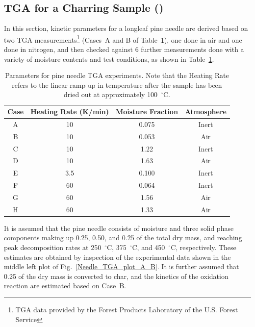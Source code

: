 \documentclass[11pt]{book}
\begin{document}
\subsection{TGA for a Charring Sample (\texorpdfstring{}{Needle\_TGA})}
\label{Needle_TGA}

In this section, kinetic parameters for a longleaf pine needle are derived based on two TGA measurements\footnote{TGA data provided by the Forest Products Laboratory of the U.S. Forest Service} (Cases~A and B of Table~\ref{Needle_TGA_table}), one done in air and one done in nitrogen, and then checked against 6 further measurements done with a variety of moisture contents and test conditions, as shown in Table~\ref{Needle_TGA_table}.

\begin{table}[!ht]
\centering
\caption[Parameters for pine needle TGA experiments]{Parameters for pine needle TGA experiments. Note that the Heating Rate refers to the linear ramp up in temperature after the sample has been dried out at approximately 100~$^\circ$C.}
\label{Needle_TGA_table}
\begin{tabular}{|c|c|c|c|}
\hline
Case & Heating Rate (K/min)  & Moisture Fraction & Atmosphere \\ \hline
A    & 10                    & 0.075             & Inert      \\
B    & 10                    & 0.053             & Air        \\
C    & 10                    & 1.22              & Inert      \\
D    & 10                    & 1.63              & Air        \\
E    & 3.5                   & 0.100             & Inert      \\
F    & 60                    & 0.064             & Inert      \\
G    & 60                    & 1.56              & Air        \\
H    & 60                    & 1.33              & Air        \\ \hline
\end{tabular}
\end{table}

It is assumed that the pine needle consists of moisture and three solid phase components making up 0.25, 0.50, and 0.25 of the total dry mass, and reaching peak decomposition rates at 250~$^\circ$C, 375~$^\circ$C, and 450~$^\circ$C, respectively. These estimates are obtained by inspection of the experimental data shown in the middle left plot of Fig.~\ref{Needle_TGA_plot_A_B}. It is further assumed that 0.25 of the dry mass is converted to char, and the kinetics of the oxidation reaction are estimated based on Case~B.
\end{document}
